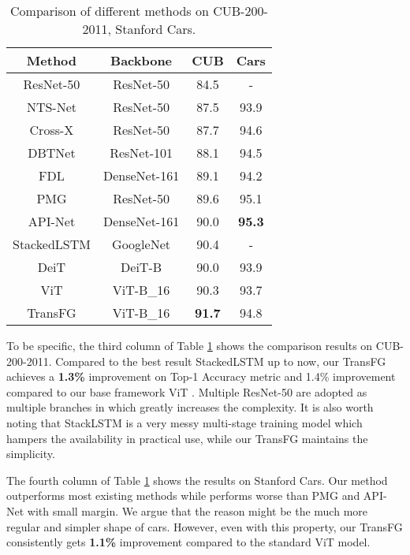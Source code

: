 \begin{table}[]
    \small
    \centering
    \caption{Comparison of different methods on CUB-200-2011, Stanford Cars.}
    \label{tab:cub}
    \begin{tabular}{c|c|c|c}
    \hline
    Method & Backbone & CUB & Cars \\ \hline
    ResNet-50 & ResNet-50 & 84.5 & - \\
    NTS-Net & ResNet-50 & 87.5 & 93.9 \\ 
    Cross-X & ResNet-50 & 87.7 & 94.6 \\
    DBTNet & ResNet-101 & 88.1 & 94.5 \\
    FDL & DenseNet-161 & 89.1 & 94.2 \\
    PMG & ResNet-50 & 89.6 & 95.1 \\ 
    API-Net & DenseNet-161 & 90.0 & \textbf{95.3} \\
    StackedLSTM & GoogleNet & 90.4 & - \\ \hline
    DeiT & DeiT-B & 90.0 & 93.9 \\
    ViT & ViT-B\_16 & 90.3 & 93.7 \\ 
    TransFG & ViT-B\_16 & \textbf{91.7} & 94.8 \\ \hline
    \end{tabular}
\end{table}

To be specific, the third column of Table \ref{tab:cub} shows the comparison results on CUB-200-2011. Compared to the best result StackedLSTM \cite{Ge_2019_CVPR} up to now, our TransFG achieves a \textbf{1.3\%} improvement on Top-1 Accuracy metric and 1.4\% improvement compared to our base framework ViT \cite{dosovitskiy2020image}. Multiple ResNet-50 are adopted as multiple branches in \cite{ding2019selective} which greatly increases the complexity. It is also worth noting that StackLSTM is a very messy multi-stage training model which hampers the availability in practical use, while our TransFG maintains the simplicity.

The fourth column of Table \ref{tab:cub} shows the results on Stanford Cars. Our method outperforms most existing methods while performs worse than PMG \cite{du2020fine} and API-Net \cite{zhuang2020learning} with small margin. We argue that the reason might be the much more regular and simpler shape of cars. However, even with this property, our TransFG consistently gets \textbf{1.1\%} improvement compared to the standard ViT model.

